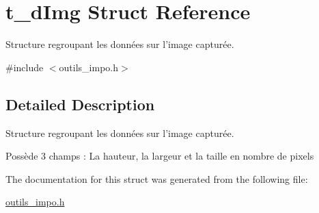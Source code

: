 \hypertarget{structt__dImg}{\section{t\-\_\-d\-Img Struct Reference}
\label{structt__dImg}
}


Structure regroupant les données sur l'image capturée.  




{\ttfamily \#include $<$outils\-\_\-impo.\-h$>$}



\subsection{Detailed Description}
Structure regroupant les données sur l'image capturée. 

Possède 3 champs \-: La hauteur, la largeur et la taille en nombre de pixels 

The documentation for this struct was generated from the following file\-:\begin{DoxyCompactItemize}
\item 
\hyperlink{outils__impo_8h}{outils\-\_\-impo.\-h}\end{DoxyCompactItemize}
